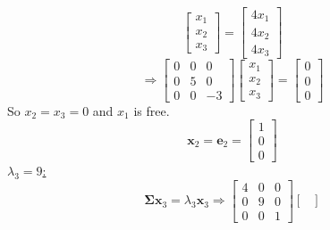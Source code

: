 \begin{enumerate}[label=(\alph*)]
\[                \begin{bmatrix}
                    x_1 \\
                    x_2 \\
                    x_3
                \end{bmatrix}
                =
                \begin{bmatrix}
                    4x_1 \\
                    4x_2 \\
                    4x_3
                \end{bmatrix}
            \]
            \[
                \Rightarrow
                \begin{bmatrix}
                    0 & 0 & 0\\
                    0 & 5 & 0\\
                    0 & 0 & -3
                \end{bmatrix}
                \begin{bmatrix}
                    x_1 \\
                    x_2 \\
                    x_3
                \end{bmatrix}
                =
                \begin{bmatrix}
                    0 \\
                    0 \\
                    0
                \end{bmatrix}
            \]
            So $x_2 = x_3 = 0$ and $x_1$ is free.
            \[
                \mathbf{x}_2
                =
                \mathbf{e}_2
                =
                \begin{bmatrix}
                    1 \\
                    0 \\
                    0
                \end{bmatrix}
            \]
            \underline{$\lambda_3 = 9$:}
            \[
                \mathbf{\Sigma}\mathbf{x}_3 = \lambda_3\mathbf{x}_3
                \Rightarrow
                \begin{bmatrix}
                    4 & 0 & 0\\
                    0 & 9 & 0\\
                    0 & 0 & 1
                \end{bmatrix}
                \begin{bmatrix}

\end{bmatrix}\]
\end{enumerate}
